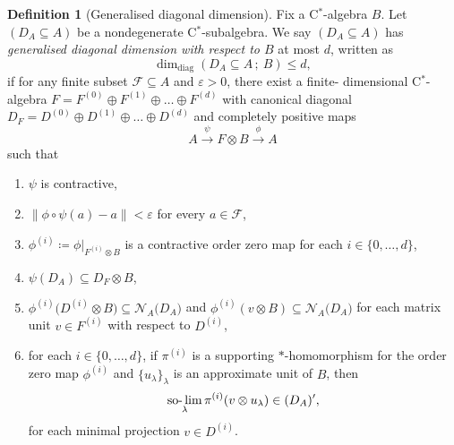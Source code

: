 \documentclass[a4paper]{amsart}
\newcommand{\myhyp}{\textnormal{-}\hskip0pt\relax}
\numberwithin{equation}{section}
\newcommand{\Fcal}{\mathcal{F}}
\newcommand{\e}{\varepsilon}
\newcommand{\cstar}{C$^\ast$\myhyp{}algebra}
\newcommand{\cstarSub}{C$^\ast$\myhyp{}subalgebra}
\newcommand{\prn}[1]{{(#1)}}
\DeclareMathOperator{\solim}{\mathrm{so\myhyp{}}\lim}
\newcommand{\normreg}[1]{{\lVert #1  \rVert}}
\newcommand{\normalisers}[2]{{\mathcal{N}}_{#2}{\big({#1}\big)}}
\newcommand{\ddimn}[3]{\dim_{\mathrm{diag}}({#1}\subseteq{#2}\, ;~{#3})}
\theoremstyle{plain}
\theoremstyle{indented}
\numberwithin{equation}{section}
\theoremstyle{definition}
\theoremstyle{remark}
\theoremstyle{plain}
\theoremstyle{definition}
\newtheorem{alphdef}[alphthm]{Definition}
\begin{document}
\begin{alphdef}[Generalised diagonal dimension] \label{intro:def:genDiagDim}
    Fix a \cstar{} $B$. 
    Let \linebreak
    ${(D_A\subseteq{A})}$ be a nondegenerate \cstarSub{}. 
    We say ${(D_A \subseteq A)}$ has \emph{generalised diagonal dimension with respect to $B$} at most $d$, written as
    \[\ddimn{D_A}{A}{B} \le d,\]
    if for any finite subset 
    ${\Fcal \subseteq {A}}$ and ${\e > 0}$, there exist a finite\myhyp{}
    \linebreak 
    dimensional
    \cstar{} 
    ${F=F^{(0)}\oplus F^{(1)} \oplus \hdots \oplus F^{(d)}}$ 
    with canonical diagonal \linebreak
    ${D_F = D^{(0)} \oplus D^{(1)} \oplus \hdots \oplus D^{(d)}}$ 
    and completely positive maps 
    \[ {A \overset{\psi}{\longrightarrow} F \otimes B \overset{\phi}{\longrightarrow} A}\]
    such that
    {
    \begin{enumerate} \renewcommand{\labelenumi}{(\arabic{enumi})}
        \item $\psi$ is contractive,
        \item ${\normreg{\phi \circ \psi(a) - a } < \e }$ for every $a \in \Fcal$,
        \item ${\phi^{(i)} \coloneq \phi|_{F^{(i)} \otimes B}}$ is a contractive order zero map for each ${i \in \{0,\hdots,d\}}$,
        \item ${\psi(D_A) \subseteq D_F \otimes B}$,
        
        
        \item ${\phi^{(i)} \big( {D^{(i)} \otimes B} \big) \subseteq \normalisers{D_A}{A}}$
        and
        ${\phi^{(i)} ( v \otimes B )  \subseteq \normalisers{D_A}{A}}$
        for each matrix unit ${v \in F^\prn{i}}$ with respect to ${D^{\prn{i}}}$,
        
        \item for each ${i\in \{0,\hdots, d\}}$, if
        $\pi^{(i)}$ is a supporting ${\ast}$\myhyp{}homomorphism for the order zero map $\phi^{(i)}$ and ${\{u_\lambda\}_\lambda}$ is an approximate unit of $B$, then
        \[{\solim_\lambda \pi^{(i)}(v \otimes u_\lambda) \in (D_A)'},\]
        for each minimal projection ${v \in D^{\prn{i}}}$. \label{eq:condition6GenDiagDim}
        
        
    \end{enumerate}
    }
\end{alphdef}
\end{document}
